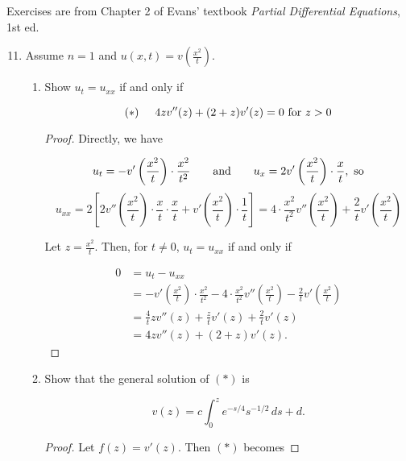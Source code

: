\documentclass[11pt,oneside,english]{amsart}
\theoremstyle{definition}
\newcommand{\aspace}{\hspace{7mm}\text{and}\hspace{7mm}}
\begin{document}
\rightline{\today}


Exercises are from Chapter 2 of Evans' textbook \textit{Partial Differential Equations}, 1st ed. 

\vspace{5mm}
\begin{enumerate}

\setcounter{enumi}{10}





\item Assume $n=1$ and $\displaystyle u(x,t)=v\left(\frac{x^2}{t}\right)$.

\begin{enumerate}

\item Show $u_t=u_{xx}$ if and only if 

\[
(*) \hspace{5mm}4zv''(z)+(2+z)v'(z)=0 \text{ for } z>0
\]

\begin{proof}
Directly, we have

\[
u_t=-v'\left(\frac{x^2}{t}\right)\cdot\frac{x^2}{t^2}\aspace u_x=2v'\left(\frac{x^2}{t}\right)\cdot\frac{x}{t},\text{ so}
\]
\[
u_{xx}=2\left[2v''\left(\frac{x^2}{t}\right)\cdot\frac{x}{t}\cdot\frac{x}{t}+v'\left(\frac{x^2}{t}\right)\cdot\frac{1}{t}\right]=4\cdot\frac{x^2}{t^2}v''\left(\frac{x^2}{t}\right)+\frac{2}{t}v'\left(\frac{x^2}{t}\right)
\]

Let $z=\frac{x^2}{t}$. Then, for $t\neq0$, $u_t=u_{xx}$ if and only if

\begin{align*}
0&=u_t-u_{xx}\\[2mm]
&=-v'\left(\frac{x^2}{t}\right)\cdot\frac{x^2}{t^2}-4\cdot\frac{x^2}{t^2}v''\left(\frac{x^2}{t}\right)-\frac{2}{t}v'\left(\frac{x^2}{t}\right)\\[2mm]
&=\frac{4}{t}zv''(z)+\frac{z}{t}v'(z)+\frac{2}{t}v'(z)\\[2mm]
&=4zv''(z)+(2+z)v'(z).
\end{align*}
\end{proof}
\pagebreak

\item Show that the general solution of $(*)$ is

\[
v(z)=c\int_0^ze^{-s/4}s^{-1/2}\,ds+d.
\]

\begin{proof}
Let $f(z)=v'(z)$. Then $(*)$ becomes 


\end{proof}
\end{enumerate}
\end{enumerate}
\end{document}
